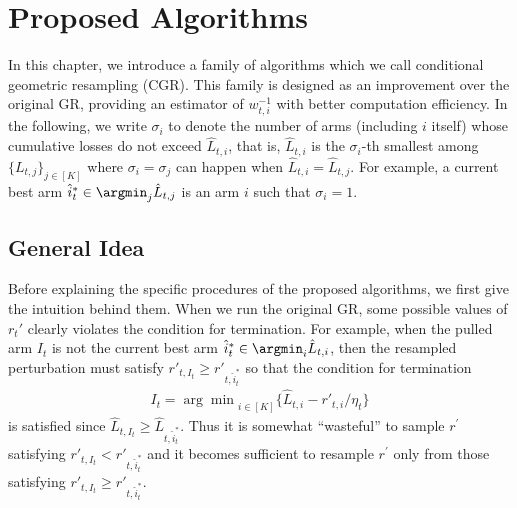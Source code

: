\section{Proposed Algorithms}\label{sec:proposed_algorithms}
In this chapter, we introduce a family of algorithms which we call conditional geometric resampling (CGR).
This family is designed as an improvement over the original GR, providing an estimator of $w_{t,i}^{-1}$ with better computation efficiency.  
In the following,
we write $\sigma_i$ to denote the number of arms (including $i$ itself) whose cumulative losses do not exceed $\hat{L}_{t,i}$,
that is,
$\hat{L}_{t,i}$ is the $\sigma_i$-th smallest among $\{L_{t,j}\}_{j\in[K]}$ where $\sigma_i=\sigma_j$ can happen when $\hat{L}_{t,i}=\hat{L}_{t,j}$.
For example, a current best arm $\hat{i}_t^*\in \argmin_{j}\hat{L}_{t,j}$
is an arm $i$ such that $\sigma_i=1$.
\vspace{-0.3em}
\subsection{General Idea}
Before explaining the specific procedures of the proposed algorithms,
we first give the intuition behind them.
When we run the original GR,
some possible values of $r_t'$ clearly violates the condition for termination.
For example, when the pulled arm $I_t$ is not the current best arm $\hat{i}_t^*\in\argmin_{i}\hat{L}_{t,i}$,
then the resampled perturbation must satisfy $r'_{t,I_t}\ge r'_{t,\hat{i}_t^*}$
so that the condition for termination
\begin{align}
I_t = {\arg\min}_{i \in [K]} \{\hat{L}_{t,i} - r'_{t,i} / \eta_t\}
\label{cond_termination}
\end{align}
is satisfied since $\hat{L}_{t,I_t}\ge\hat{L}_{t,\hat{i}_t^*}$.
Thus it is somewhat ``wasteful'' to sample $r^{\prime}$ satisfying $r'_{t,I_t}< r'_{t,\hat{i}_t^*}$
and it becomes sufficient to resample $r^{\prime}$ only from those satisfying $r'_{t,I_t}\ge r'_{t,\hat{i}_t^*}$.

